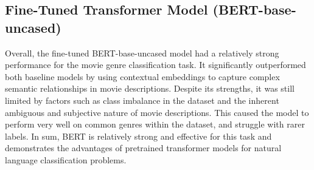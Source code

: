 \subsection{Fine-Tuned Transformer Model (BERT-base-uncased)}
Overall, the fine-tuned BERT-base-uncased model had a relatively strong performance for the movie genre classification task. It significantly outperformed both baseline models by using contextual embeddings to capture complex semantic relationships in movie descriptions. 
Despite its strengths, it was still limited by factors such as class imbalance in the dataset and the inherent ambiguous and subjective nature of movie descriptions. This caused the model to perform very well on common genres within the dataset, and struggle with rarer labels. 
In sum, BERT is relatively strong and effective for this task and demonstrates the advantages of pretrained transformer models for natural language classification problems. 
